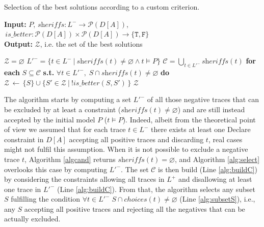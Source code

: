 \documentclass[a4wide,11pt]{article}
\theoremstyle{definition}
\theoremstyle{plain}
\newcommand{\sheriff}{sheriffs}
\begin{document}
\begin{algorithm}
    \caption{Selection of the best solutions according to a custom criterion.}
    \label{alg:select}
    \textbf{Input:}  $P,\, \textit{\sheriff} : L^- \rightarrow \mathcal{P}({D[A]})$,$\,{is\_better}:\mathcal{P}({D[A]})\times\mathcal{P}({D[A]})\rightarrow \{\texttt{T},\texttt{F}\}$\\
    \textbf{Output:} $\mathcal{Z}$, i.e. the set of the best solutions
	\begin{algorithmic}[1] 
   \Procedure{Selection}{$\textit{\sheriff},\, P$} 
   	\State $\mathcal{Z}=\varnothing$
  	\State $ L'^- = \{t \in L^- \: | \: \textit{\sheriff}(t) \neq \varnothing \land t\models P\}$
	\State $\mathcal{C} = \bigcup_{t\in L'^-} \textit{\sheriff}(t)$\label{alg:buildC}
	\State \textbf{for each} $S \subseteq \mathcal{C}$ \textbf{s.t.} $\forall t \in L'^-, \; S\cap \textit{\sheriff}(t) \neq \varnothing$ \textbf{do} \label{alg:subsetS}
	\Indent
		 \label{alg:isbetter}
		\State $\mathcal{Z} \, \leftarrow\, \{S\} \cup \{ S'\in\mathcal{Z}\ |\ !is\_better(S,S')\,\}$ \label{alg:previousAreOk}
		\EndIf
	\EndIndent
	\State \Return $\mathcal{Z}$  
    \EndProcedure
    \end{algorithmic}
\end{algorithm}

The algorithm starts by computing a set $L'^-$ of all those negative traces that can be excluded by at least a constraint ($\textit{\sheriff}(t)\neq\varnothing$) and are still instead accepted by the initial model $P$ ($t\models P$). 
Indeed, albeit from the theoretical point of view we assumed that for each trace $t \in L^-$ there exists at least one Declare constraint in $D[A]$ accepting all positive traces and discarding $t$, real cases might not fulfil this assumption.%
When it is not possible to exclude a negative trace $t$, Algorithm \ref{algcand} returns $\textit{\sheriff}(t)=\varnothing$, and Algorithm \ref{alg:select} overlooks this case by computing $L'^-$. 
%
The set $\mathcal{C}$ is then build (Line \ref{alg:buildC}) by considering the constraints allowing all traces in $L^+$ and disallowing at least one trace in $L'^-$ (Line \ref{alg:buildC}). From that, the algorithm selects any subset $S$ fulfilling the condition $\forall t \in L'^- \; S\cap {choices}(t) \neq \varnothing$ (Line \ref{alg:subsetS}), i.e., any $S$ accepting all positive traces and rejecting all the negatives that can be actually excluded.
\end{document}
